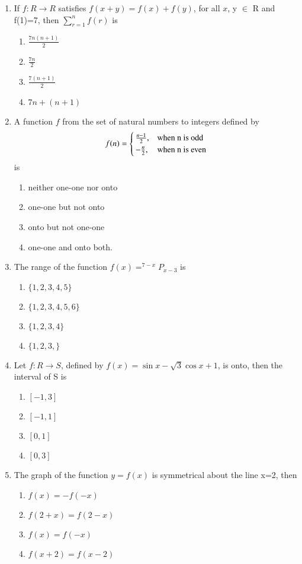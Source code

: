\begin{enumerate}[label=\arabic*.,ref=\thesubsection.\theenumi]
\item If $f: R \rightarrow R$ satisfies $f(x+y)=f(x)+f(y)$, for all $x$, y $\in$ R and f(1)=7, then 
$\sum_{r=1}^{n} f(r)$ is
\begin{enumerate}
\item $\frac{7n(n+1)}{2}$
\item $\frac{7n}{2}$
\item $\frac{7(n+1)}{2}$
\item $7n+(n+1)$
\end{enumerate}

\item A function $f$ from the set of natural numbers to integers defined by \[f(n)=\begin{cases} 
       \frac{n-1}{2}, & $when n is odd$\\
       -\frac{n}{2}, & $when n is even$\\
   \end{cases}\] is
\begin{enumerate}
\item neither one-one nor onto
\item one-one but not onto
\item onto but not one-one
\item one-one and onto both.
\end{enumerate}
    
\item The range of the function $f(x)= ^{7-x}P_{x-3}$ is
\begin{enumerate}
\item $\{1,2,3,4,5\}$
\item $\{1,2,3,4,5,6\}$
\item $\{1,2,3,4\}$
\item $\{1,2,3,\}$
\end{enumerate}

\item Let $f: R \rightarrow S$, defined by $f(x)=\sin x-\sqrt{3}\cos x+1$, is onto, then the interval of S is
\begin{enumerate}
\item $[-1,3]$
\item $[-1,1]$
\item $[0,1]$
\item $[0,3]$
\end{enumerate}

\item The graph of the function $y=f(x)$ is symmetrical about the line x=2, then
\begin{enumerate}
\item $f(x)=-f(-x)$
\item $f(2+x)=f(2-x)$
\item $f(x)=f(-x)$
\item $f(x+2)=f(x-2)$
\end{enumerate}


\end{enumerate}
